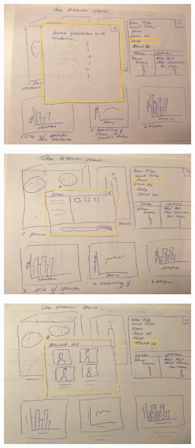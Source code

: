 \documentclass{article}
\begin{document}
\begin{itemize}
\begin{figure}[!h]
\centering
\includegraphics[width=0.9\textwidth]{images/Scenario5.jpg}
\label{fig19}
\end{figure}
\newpage
\begin{figure}[!h]
\centering
\includegraphics[width=0.9\textwidth]{images/Scenario6.jpg}
\label{fig20}
\end{figure}

\begin{figure}[!h]
\centering
\includegraphics[width=0.9\textwidth]{images/Scenario7.jpg}
\label{fig21}
\end{figure}
\end{itemize}
\newpage
\end{document}
